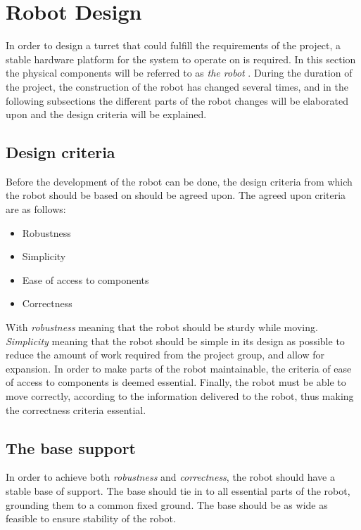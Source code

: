 \section{Robot Design}\label{Design:Robot}
In order to design a turret that could fulfill the requirements of the project, a stable hardware platform for the system to operate on is required. 
In this section the physical components will be referred to as \textit{the robot} .
During the duration of the project, the construction of the robot has changed several times, and in the following subsections the different parts of the robot changes will be elaborated upon and the design criteria will be explained. 

\subsection{Design criteria}
Before the development of the robot can be done, the design criteria from which the robot should be based on should be agreed upon. 
The agreed upon criteria are as follows:
\begin{itemize}
    \item Robustness
    \item Simplicity
    \item Ease of access to components
    \item Correctness
\end{itemize}

With \textit{robustness} meaning that the robot should be sturdy while moving.
\textit{Simplicity} meaning that the robot should be simple in its design as possible to reduce the amount of work required from the project group, and allow for expansion. 
In order to make parts of the robot maintainable, the criteria of ease of access to components is deemed essential. 
Finally, the robot must be able to move correctly, according to the information delivered to the robot, thus making the correctness criteria essential. 

\subsection{The base support}
In order to achieve both \textit{robustness} and \textit{correctness}, the robot should have a stable base of support. 
The base should tie in to all essential parts of the robot, grounding them to a common fixed ground.
The base should be as wide as feasible to ensure stability of the robot. 

